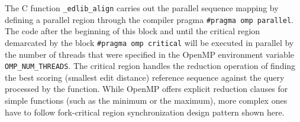 \documentclass[10pt]{article}
\begin{document}
The C function \texttt{\_edlib\_align} carries out the parallel sequence mapping by defining a parallel region through the compiler pragma \texttt{\#pragma omp parallel}. The code after the beginning of this block and until the critical region demarcated by the block \texttt{\#pragma omp critical} will be executed in parallel by the number of threads that were specified in the OpenMP environment variable \texttt{OMP\_NUM\_THREADS}. The critical region handles the reduction operation of finding the best scoring (smallest edit distance) reference sequence against the query processed by the function. While OpenMP offers explicit reduction clauses for simple functions (such as the minimum or the maximum), more complex ones have to follow fork-critical region synchronization design pattern shown here. 
\end{document}
